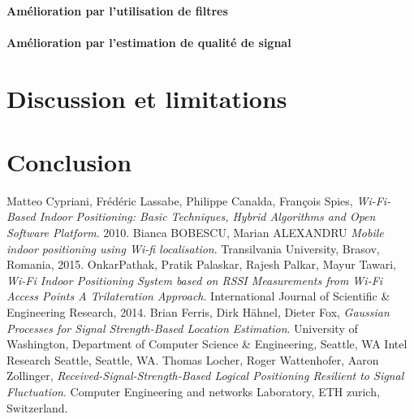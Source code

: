 \documentclass[11pt,journal,compsoc]{IEEEtran}
\begin{document}
      \paragraph{Amélioration par l'utilisation de filtres}
      \paragraph{Amélioration par l'estimation de qualité de signal}
\section{Discussion et limitations}
\section{Conclusion}

\begin{thebibliography}{9}
    Matteo Cypriani, Frédéric Lassabe, Philippe Canalda, François Spies,
    \emph{Wi-Fi-Based Indoor Positioning: Basic Techniques, Hybrid Algorithms and Open Software Platform}.
    2010.
    Bianca BOBESCU, Marian ALEXANDRU
    \emph{Mobile indoor positioning using Wi-fi localisation}.
    Transilvania University, Brasov, Romania,
    2015.
    OnkarPathak, Pratik Palaskar, Rajesh Palkar, Mayur Tawari,
    \emph{Wi-Fi Indoor Positioning System based on RSSI Measurements from Wi-Fi Access Points A Trilateration Approach}.
    International Journal of Scientific \& Engineering Research,
    2014.
    Brian Ferris, Dirk Hähnel, Dieter Fox,
    \emph{Gaussian Processes for Signal Strength-Based Location Estimation}.
    University of Washington, Department of Computer Science \& Engineering, Seattle, WA Intel Research Seattle, Seattle, WA.
    Thomas Locher, Roger Wattenhofer, Aaron Zollinger,
    \emph{Received-Signal-Strength-Based Logical Positioning Resilient to Signal Fluctuation}.
    Computer Engineering and networks Laboratory, ETH zurich, Switzerland.
\end{thebibliography}
\end{document}

